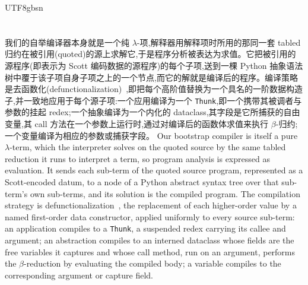 \begin{CJK*}{UTF8}{gbsn}
  \section{}\label{app:compiler}
  \ifPaperChinese
  我们的自举编译器本身就是一个纯 $\lambda$-项,解释器用解释项时所用的那同一套 tabled 归约在被引用(quoted)的源上求解它,于是程序分析被表达为求值。它把被引用的源程序(即表示为 Scott 编码数据的源程序)的每个子项,送到一棵 Python 抽象语法树中覆于该子项自身子项之上的一个节点,而它的解就是编译后的程序。编译策略是去函数化(defunctionalization)~\cite{reynolds1972-definitional-interpreters-defunctionalization},即把每个高阶值替换为一个具名的一阶数据构造子,并一致地应用于每个源子项:一个应用编译为一个 \texttt{Thunk},即一个携带其被调者与参数的挂起 redex;一个抽象编译为一个内化的 dataclass,其字段是它所捕获的自由变量,其 call 方法在一个参数上运行时,通过对编译后的函数体求值来执行 $\beta$-归约;一个变量编译为相应的参数或捕获字段。
  \else
  Our bootstrap compiler is itself a pure $\lambda$-term, which the interpreter solves on the quoted source by the same tabled reduction it runs to interpret a term, so program analysis is expressed as evaluation. It sends each sub-term of the quoted source program, represented as a Scott-encoded datum, to a node of a Python abstract syntax tree over that sub-term's own sub-terms, and its solution is the compiled program. The compilation strategy is defunctionalization~\cite{reynolds1972-definitional-interpreters-defunctionalization}, the replacement of each higher-order value by a named first-order data constructor, applied uniformly to every source sub-term: an application compiles to a \texttt{Thunk}, a suspended redex carrying its callee and argument; an abstraction compiles to an interned dataclass whose fields are the free variables it captures and whose call method, run on an argument, performs the $\beta$-reduction by evaluating the compiled body; a variable compiles to the corresponding argument or capture field.
  \fi


\end{CJK*}
